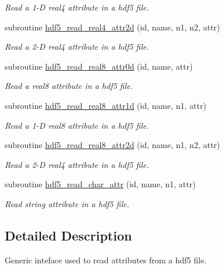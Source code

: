 \begin{DoxyCompactItemize}
\begin{DoxyCompactList}\small\item\em Read a 1-\/\-D real4 attribute in a hdf5 file. \end{DoxyCompactList}\item 
subroutine \hyperlink{interfacemodhdf5_1_1hdf5__read__attr_a1c6f87720f189a2302ed117e27441c2e}{hdf5\-\_\-read\-\_\-real4\-\_\-attr2d} (id, name, n1, n2, attr)
\begin{DoxyCompactList}\small\item\em Read a 2-\/\-D real4 attribute in a hdf5 file. \end{DoxyCompactList}\item 
subroutine \hyperlink{interfacemodhdf5_1_1hdf5__read__attr_aa0543551e37cada35de8bc387d679a60}{hdf5\-\_\-read\-\_\-real8\-\_\-attr0d} (id, name, attr)
\begin{DoxyCompactList}\small\item\em Read a real8 attribute in a hdf5 file. \end{DoxyCompactList}\item 
subroutine \hyperlink{interfacemodhdf5_1_1hdf5__read__attr_a00681ffabb305348c87b169a8e541a00}{hdf5\-\_\-read\-\_\-real8\-\_\-attr1d} (id, name, n1, attr)
\begin{DoxyCompactList}\small\item\em Read a 1-\/\-D real8 attribute in a hdf5 file. \end{DoxyCompactList}\item 
subroutine \hyperlink{interfacemodhdf5_1_1hdf5__read__attr_a81c3ea7a304841609d46f0c39e183fa1}{hdf5\-\_\-read\-\_\-real8\-\_\-attr2d} (id, name, n1, n2, attr)
\begin{DoxyCompactList}\small\item\em Read a 2-\/\-D real4 attribute in a hdf5 file. \end{DoxyCompactList}\item 
subroutine \hyperlink{interfacemodhdf5_1_1hdf5__read__attr_a12ed53d4b17f713c6dff6d09c93eae93}{hdf5\-\_\-read\-\_\-char\-\_\-attr} (id, name, n1, attr)
\begin{DoxyCompactList}\small\item\em Read string attribute in a hdf5 file. \end{DoxyCompactList}\end{DoxyCompactItemize}


\subsection{Detailed Description}
Generic inteface used to read attributes from a hdf5 file. 


